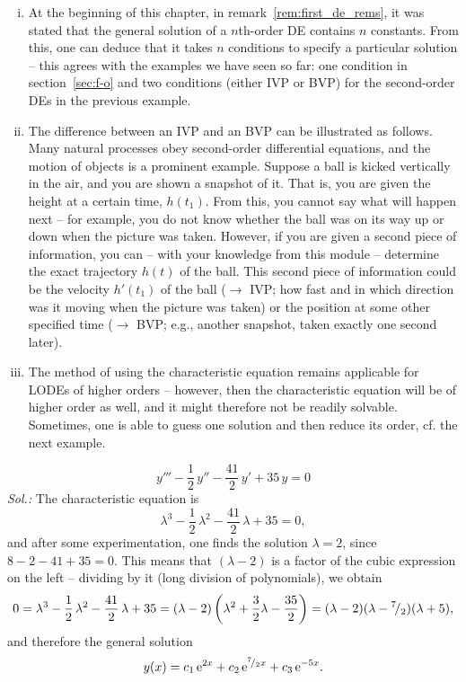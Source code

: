 \begin{remark}
\begin{enumerate}[(i)]
	\item At the beginning of this chapter, in remark~\ref{rem:first_de_rems}, it was stated that the general solution of a $n$th-order DE contains $n$ constants. From this, one can deduce that it takes $n$ conditions to specify a particular solution -- this agrees with the examples we have seen so far: one condition in section~\ref{sec:f-o} and two conditions (either IVP or BVP) for the second-order DEs in the previous example.
	\item The difference between an IVP and an BVP can be illustrated as follows. Many natural processes obey second-order differential equations, and the motion of objects is a prominent example. Suppose a ball is kicked vertically in the air, and you are shown a snapshot of it. That is, you are given the height at a certain time, $h(t_1)$. From this, you cannot say what will happen next -- for example, you do not know whether the ball was on its way up or down when the picture was taken. However, if you are given a second piece of information, you can -- with your knowledge from this module -- determine the exact trajectory $h(t)$ of the ball. This second piece of information could be the velocity $h'(t_1)$ of the ball ($\rightarrow$ IVP; how fast and in which direction was it moving when the picture was taken) or the position at some other specified time ($\rightarrow$ BVP; e.g., another snapshot, taken exactly one second later).
	\item The method of using the characteristic equation remains applicable for LODEs of higher orders -- however, then the characteristic equation will be of higher order as well, and it might therefore not be readily solvable. Sometimes, one is able to guess one solution and then reduce its order, cf. the next example.
\end{enumerate}
\end{remark}

\begin{example}
\[ y''' - \frac12 \, y'' -\frac{41}{2} \, y' + 35 \, y = 0 \]
{\it Sol.:} The characteristic equation is 
\[ \lambda^3 - \frac12 \, \lambda^2 -\frac{41}{2} \, \lambda + 35 = 0, \]
and after some experimentation, one finds the solution $\lambda = 2$, since $8-2-41+35=0$.  This means that $(\lambda-2)$ is a factor of the cubic expression on the left -- dividing by it (long division of polynomials), we obtain
\[ 0 = \lambda^3 - \frac12 \, \lambda^2 -\frac{41}{2} \, \lambda + 35 
= (\lambda-2)\left( \lambda^2+\frac32\lambda-\frac{35}{2} \right) = (\lambda-2)(\lambda-{}^{7}\!/_{2})(\lambda+5),\]
and therefore the general solution
\[ y(x) = c_1\,\mathrm{e}^{2x} + c_2\,\mathrm{e}^{{}^{7}\!/_{2}x} + c_3\,\mathrm{e}^{-5x}. \]
\end{example}

